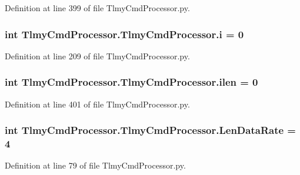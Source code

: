 Definition at line 399 of file Tlmy\+Cmd\+Processor.\+py.

\hypertarget{namespace_tlmy_cmd_processor_1_1_tlmy_cmd_processor_a1eff3ca925b902581b463553a187bba9}{}
\subsubsection[{i}]{\setlength{\rightskip}{0pt plus 5cm}int Tlmy\+Cmd\+Processor.\+Tlmy\+Cmd\+Processor.\+i = 0}\label{namespace_tlmy_cmd_processor_1_1_tlmy_cmd_processor_a1eff3ca925b902581b463553a187bba9}


Definition at line 209 of file Tlmy\+Cmd\+Processor.\+py.

\hypertarget{namespace_tlmy_cmd_processor_1_1_tlmy_cmd_processor_a4d7892459a440d68eb1b1eaf214ccc74}{}
\subsubsection[{ilen}]{\setlength{\rightskip}{0pt plus 5cm}int Tlmy\+Cmd\+Processor.\+Tlmy\+Cmd\+Processor.\+ilen = 0}\label{namespace_tlmy_cmd_processor_1_1_tlmy_cmd_processor_a4d7892459a440d68eb1b1eaf214ccc74}


Definition at line 401 of file Tlmy\+Cmd\+Processor.\+py.

\hypertarget{namespace_tlmy_cmd_processor_1_1_tlmy_cmd_processor_ad594ffcbc7ad47494749f33e26f93c2b}{}
\subsubsection[{Len\+Data\+Rate}]{\setlength{\rightskip}{0pt plus 5cm}int Tlmy\+Cmd\+Processor.\+Tlmy\+Cmd\+Processor.\+Len\+Data\+Rate = 4}\label{namespace_tlmy_cmd_processor_1_1_tlmy_cmd_processor_ad594ffcbc7ad47494749f33e26f93c2b}


Definition at line 79 of file Tlmy\+Cmd\+Processor.\+py.

